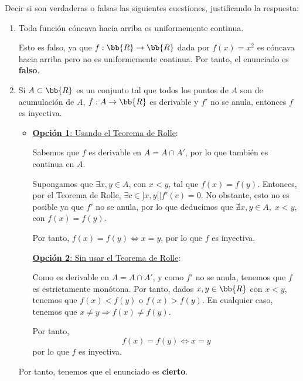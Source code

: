 \documentclass[12pt]{article}
\begin{document}
\begin{ejercicio} 
    Decir si son verdaderas o falsas las siguientes cuestiones, justificando la respuesta:

    \begin{enumerate}
        \item Toda función cóncava hacia arriba es uniformemente continua.

        Esto es falso, ya que $f:\bb{R}\to \bb{R}$ dada por $f(x)=x^2$ es cóncava hacia arriba pero no es uniformemente continua. Por tanto, el enunciado es \textbf{falso}.

        \item Si $A\subset \bb{R}$ es un conjunto tal que todos los puntos de $A$ son de acumulación de $A$, $f:A\to \bb{R}$ es derivable y $f'$ no se anula, entonces $f$ es inyectiva.

        \begin{itemize}
            \item \underline{\textbf{Opción 1}: Usando el Teorema de Rolle}:

            Sabemos que $f$ es derivable en $A=A\cap A'$, por lo que también es continua en $A$.

            Supongamos que $\exists x,y\in A$, con $x<y$, tal que $f(x)=f(y)$. Entonces, por el Teorema de Rolle, $\exists c\in ]x,y[\mid f'(c)=0$. No obstante, esto no es posible ya que $f'$ no se anula, por lo que deducimos que $\nexists x,y\in A,\;x<y$, con $f(x)=f(y)$.
            
            Por tanto, $f(x)=f(y) \Longleftrightarrow x=y$, por lo que $f$ es inyectiva.

            \underline{\textbf{Opción 2}: Sin usar el Teorema de Rolle}:

            Como es derivable en $A=A\cap A'$, y como $f'$ no se anula, tenemos que $f$ es estrictamente monótona. Por tanto, dados $x,y\in \bb{R}$ con $x<y$, tenemos que $f(x)<f(y)$ o $f(x)>f(y)$. En cualquier caso, tenemos que $x\neq y \Longrightarrow f(x)\neq f(y)$.
            
            Por tanto,
            \begin{equation*}
                f(x)=f(y)\Longleftrightarrow x=y
            \end{equation*}
            por lo que $f$ es inyectiva.
        \end{itemize}

        Por tanto, tenemos que el enunciado es \textbf{cierto}.


\end{enumerate}
\end{ejercicio}
\end{document}
